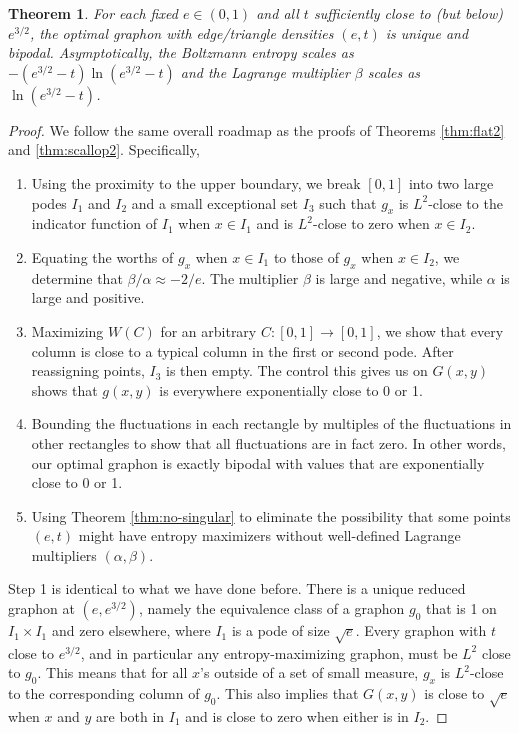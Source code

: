 \documentclass[12pt]{amsart}
\newtheorem{theorem}[lemma]{Theorem}
\newcommand{\Values}{worths}
\begin{document}
{\begin{theorem}\label{thm:top2}
For each fixed $e \in (0,1)$ and all $t$ sufficiently close to (but below) $e^{3/2}$, the 
optimal graphon with edge/triangle densities $(e,t)$ is unique and bipodal. Asymptotically, the Boltzmann entropy 
scales as $-(e^{3/2}-t)\ln(e^{3/2}-t)$
and the Lagrange multiplier $\beta$ scales as $\ln(e^{3/2}-t)$. 
\end{theorem}

\begin{proof}
We follow the same overall roadmap as 
the proofs of Theorems \ref{thm:flat2} and \ref{thm:scallop2}. 
Specifically, 
\begin{enumerate}
\item Using the proximity to the upper boundary, we break $[0,1]$
into two large podes $I_1$ and $I_2$ and a small exceptional set 
$I_3$ such 
that $g_x$ is $L^2$-close to the indicator function of $I_1$ when
$x \in I_1$ and is $L^2$-close to zero when $x \in I_2$. 
\item Equating the \Values{} of $g_x$ when $x \in I_1$ to those of 
$g_x$ when $x \in I_2$, we determine that $\beta/\alpha
\approx -2/e$. The multiplier $\beta$ is large and negative,
while $\alpha$ is large and positive. 
\item Maximizing $W(C)$ for an arbitrary $C: [0,1] \to [0,1]$, we show 
that every column is close to a typical column in the first or second
pode. After reassigning points,
$I_3$ is then empty. The control this gives us on $G(x,y)$ shows that 
$g(x,y)$ is everywhere exponentially close to 0 or 1.
\item Bounding the fluctuations in each rectangle by multiples 
of the fluctuations in other rectangles to show that all 
fluctuations are in fact zero. In other words, our optimal graphon is 
exactly bipodal with values that are exponentially close to 0 or 1. 
\item Using Theorem \ref{thm:no-singular} to eliminate the possibility
that some points $(e,t)$ might have entropy maximizers without well-defined Lagrange multipliers 
$(\alpha, \beta)$.
\end{enumerate}

Step 1 is identical to what we have done before. There is a 
unique reduced graphon at $(e, e^{3/2})$,
namely the equivalence class of a graphon $g_0$ that is 1 on $I_1 \times I_1$ and zero elsewhere, where $I_1$ is a pode of size $\sqrt{e}$. Every graphon with $t$ 
close to $e^{3/2}$, and in particular any entropy-maximizing graphon,
must be $L^2$ close to $g_0$. This means that for all $x$'s outside
of a set of small measure, $g_x$ is $L^2$-close to the corresponding
column of $g_0$. This also implies that $G(x,y)$ is close to $\sqrt{e}$
when $x$ and $y$ are both in $I_1$ and is close to zero when either
is in $I_2$. 


\end{proof}}
\end{document}
